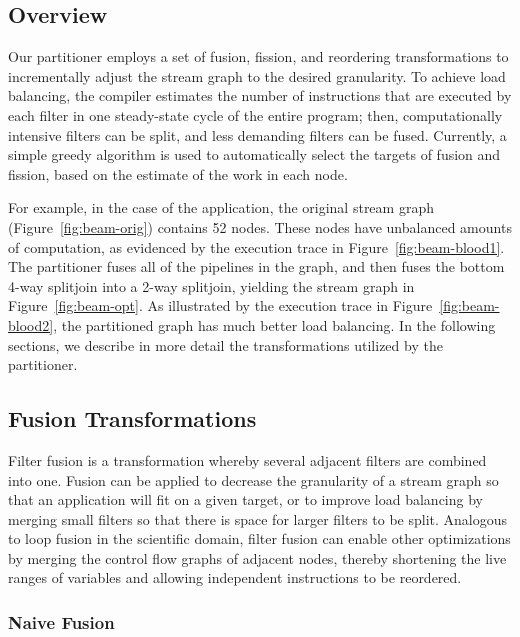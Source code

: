 \subsection{Overview}

Our partitioner employs a set of fusion, fission, and reordering
transformations to incrementally adjust the stream graph to the
desired granularity.  To achieve load balancing, the compiler
estimates the number of instructions that are executed by each filter
in one steady-state cycle of the entire program; then, computationally
intensive filters can be split, and less demanding filters can be
fused.  Currently, a simple greedy algorithm is used to automatically
select the targets of fusion and fission, based on the estimate of the
work in each node.

For example, in the case of the \Radar application, the original stream graph
(Figure~\ref{fig:beam-orig}) contains 52 nodes.  These nodes have
unbalanced amounts of computation, as evidenced by the execution trace
in Figure~\ref{fig:beam-blood1}.  The partitioner fuses all of the
pipelines in the graph, and then fuses the bottom 4-way splitjoin into
a 2-way splitjoin, yielding the stream graph in
Figure~\ref{fig:beam-opt}.  As illustrated by the execution trace in
Figure~\ref{fig:beam-blood2}, the partitioned graph has much better
load balancing.  In the following sections, we describe in more detail
the transformations utilized by the partitioner.

\subsection{Fusion Transformations}

Filter fusion is a transformation whereby several adjacent filters are
combined into one.  Fusion can be applied to decrease the granularity
of a stream graph so that an application will fit on a given target,
or to improve load balancing by merging small filters so that there is
space for larger filters to be split.  Analogous to loop fusion in the
scientific domain, filter fusion can enable other optimizations by
merging the control flow graphs of adjacent nodes, thereby shortening
the live ranges of variables and allowing independent instructions to
be reordered.

\subsubsection{Naive Fusion}

